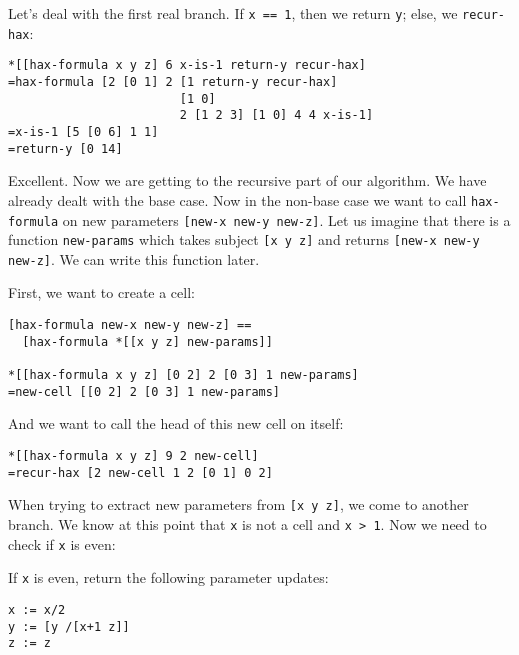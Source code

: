 \documentclass[twoside]{article}
\begin{document}
Let's deal with the first real branch.  If \lstinline[style=inlinecode]{x == 1}, then we return \lstinline[style=inlinecode]{y}; else, we \lstinline[style=inlinecode]{recur-hax}:

\begin{lstlisting}[style=listingblock]
*[[hax-formula x y z] 6 x-is-1 return-y recur-hax]
=hax-formula [2 [0 1] 2 [1 return-y recur-hax]
                        [1 0]
                        2 [1 2 3] [1 0] 4 4 x-is-1]
=x-is-1 [5 [0 6] 1 1]
=return-y [0 14]
\end{lstlisting}

Excellent. Now we are getting to the recursive part of our algorithm. We have already dealt with the base case. Now in the non-base case we want to call \lstinline[style=inlinecode]{hax-formula} on new parameters \lstinline[style=inlinecode]{[new-x new-y new-z]}. Let us imagine that there is a function \lstinline[style=inlinecode]{new-params} which takes subject \lstinline[style=inlinecode]{[x y z]} and returns \lstinline[style=inlinecode]{[new-x new-y new-z]}.  We can write this function later.

First, we want to create a cell:

\begin{lstlisting}[style=listingblock]
[hax-formula new-x new-y new-z] ==
  [hax-formula *[[x y z] new-params]]

*[[hax-formula x y z] [0 2] 2 [0 3] 1 new-params]
=new-cell [[0 2] 2 [0 3] 1 new-params]
\end{lstlisting}

And we want to call the head of this new cell on itself:

\begin{lstlisting}[style=listingblock]
*[[hax-formula x y z] 9 2 new-cell]
=recur-hax [2 new-cell 1 2 [0 1] 0 2]
\end{lstlisting}

When trying to extract new parameters from \lstinline[style=inlinecode]{[x y z]}, we come to another branch. We know at this point that \lstinline[style=inlinecode]{x} is not a cell and \lstinline[style=inlinecode]{x > 1}. Now we need to check if \lstinline[style=inlinecode]{x} is even:

If \lstinline[style=inlinecode]{x} is even, return the following parameter updates:

\begin{lstlisting}[style=listingblock]
x := x/2
y := [y /[x+1 z]]
z := z
\end{lstlisting}
\end{document}
